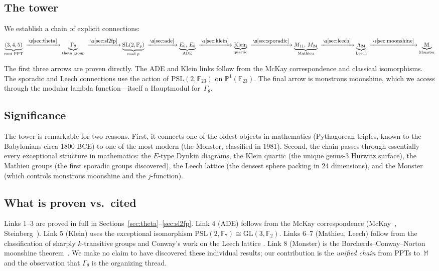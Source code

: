 \documentclass[12pt]{amsart}
\theoremstyle{definition}
\theoremstyle{remark}
\newcommand{\SL}{\mathrm{SL}}
\newcommand{\PSL}{\mathrm{PSL}}
\newcommand{\GL}{\mathrm{GL}}
\newcommand{\Fp}{\mathbb{F}_p}
\newcommand{\PP}{\mathbb{P}}
\newcommand{\Gtheta}{\Gamma_\theta}
\newcommand{\Monster}{\mathbb{M}}
\begin{document}
\subsection*{The tower}
We establish a chain of explicit connections:
\begin{equation}\label{eq:tower}
\underbrace{(3,4,5)}_{\text{root PPT}}
\;\xrightarrow{\;\S\ref{sec:theta}\;}
\underbrace{\Gtheta}_{\text{theta group}}
\;\xrightarrow{\;\S\ref{sec:sl2fp}\;}
\underbrace{\SL(2,\Fp)}_{\text{mod } p}
\;\xrightarrow{\;\S\ref{sec:ade}\;}
\underbrace{E_6,\, E_8}_{\text{ADE}}
\;\xrightarrow{\;\S\ref{sec:klein}\;}
\underbrace{\text{Klein}}_{\text{quartic}}
\;\xrightarrow{\;\S\ref{sec:sporadic}\;}
\underbrace{M_{11},\, M_{24}}_{\text{Mathieu}}
\;\xrightarrow{\;\S\ref{sec:leech}\;}
\underbrace{\Lambda_{24}}_{\text{Leech}}
\;\xrightarrow{\;\S\ref{sec:moonshine}\;}
\underbrace{\Monster}_{\text{Monster}}
\end{equation}

The first three arrows are proven directly.  The ADE and Klein links follow
from the McKay correspondence and classical isomorphisms.  The sporadic
and Leech connections use the action of $\PSL(2,\mathbb{F}_{23})$ on
$\PP^1(\mathbb{F}_{23})$.  The final arrow is monstrous moonshine,
which we access through the modular lambda function---itself a
Hauptmodul for~$\Gtheta$.

\subsection*{Significance}
The tower is remarkable for two reasons.  First, it connects one of the
oldest objects in mathematics (Pythagorean triples, known to the
Babylonians circa 1800 BCE) to one of the most modern (the Monster,
classified in 1981).  Second, the chain passes through essentially
every exceptional structure in mathematics: the $E$-type Dynkin diagrams,
the Klein quartic (the unique genus-3 Hurwitz surface), the Mathieu
groups (the first sporadic groups discovered), the Leech lattice
(the densest sphere packing in 24 dimensions), and the Monster
(which controls monstrous moonshine and the $j$-function).

\subsection*{What is proven vs.\ cited}
Links 1--3 are proved in full in Sections~\ref{sec:theta}--\ref{sec:sl2fp}.
Link 4 (ADE) follows from the McKay correspondence (McKay~\cite{mckay},
Steinberg~\cite{steinberg}).  Link 5 (Klein) uses the exceptional
isomorphism $\PSL(2,\mathbb{F}_7) \cong \GL(3,\mathbb{F}_2)$.
Links 6--7 (Mathieu, Leech) follow from the classification of sharply
$k$-transitive groups and Conway's work on the Leech lattice
\cite{conway-sloane}.  Link 8 (Monster) is the Borcherds--Conway--Norton
moonshine theorem~\cite{borcherds,conway-norton}.  We make no claim to
have discovered these individual results; our contribution is the
\emph{unified chain} from PPTs to~$\Monster$ and the observation that
$\Gtheta$ is the organizing thread.
\end{document}
